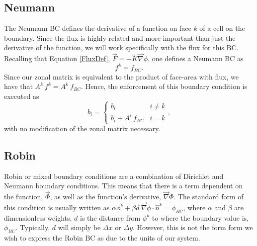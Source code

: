 \documentclass[11pt,letterpaper,oneside,notitlepage]{article}	%
\newcommand{\tensor}{\overleftrightarrow}		%
\newcommand{\del}{\vec\nabla}				%
\newcommand{\eq}[1]{Equation \eqref{#1}}		%
\newcommand{\pindent}[1]{\hspace{6mm}}  		%
\numberwithin{equation}{section}				%
\begin{document}
\subsection{Neumann}%
\pindent{}The Neumann BC defines the derivative of a function on face $k$ of a cell on the boundary. Since the flux is highly related and more important than just the derivative of the function, we will work specifically with the flux for this BC. Recalling that \eq{FluxDef}, $\vec F = -\tensor K\del\phi$, one defines a Neumann BC as
\begin{equation}
f^k = f_{BC}	\label{neumann}
.\end{equation}
Since our zonal matrix is equivalent to the product of face-area with flux, we have that $A^k\ f^k = A^k\ f_{BC}$.  Hence, the enforcement of this boundary condition is executed as
\begin{equation}b_i=\begin{cases}
b_i	& i\neq k \\
b_i+A^i\ f_{BC} 	& i=k
\end{cases},\end{equation}
with no modification of the zonal matrix necessary. 

\subsection{Robin}%
\pindent{}Robin or mixed boundary conditions are a combination of Dirichlet and Neumann boundary conditions.  This means that there is a term dependent on the function, $\vec \Phi$, as well as the function's derivative, $\vec\nabla\Phi$. The standard form of this condition is usually written as $\alpha\phi^k+\beta d\ \vec\nabla\phi\cdot\hat n^k=\phi_{BC}$, where $\alpha$ and $\beta$ are dimensionless weights, $d$ is the distance from $\phi^k$ to where the boundary value is, $\phi_{BC}$. Typically, $d$ will simply be $\Delta x$ or $\Delta y$\cite{Morel1998}. However, this is not the form form we wish to express the Robin BC as due to the units of our system.
\end{document}
